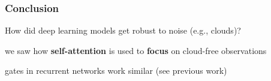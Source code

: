 \documentclass[%
  aspectratio=169,
  9pt,
  english,
  light,
  mathserif,
  professionalfont,
  affiliationintitlepagehead,
  titlegraphic,
   affiliation,
]{beamer}
\begin{document}
{\begin{frame}
	\frametitle{Conclusion}
	\Large
	
	\begin{leftbubbles}
		How did deep learning models get robust to noise {\small (e.g., clouds)}?
	\end{leftbubbles}
	
	\pause
	\begin{rightbubbles}
		we saw how \textbf{self-attention} is used to \textbf{focus} on cloud-free observations
	\end{rightbubbles}
	
	\begin{rightbubbles}
		{gates} in {recurrent networks} work similar {\small (see previous work)}
	\end{rightbubbles}
	

\end{frame}

%
%
%
%
%
%


}	
%
%
%
%
%
%	
%
\end{document}
